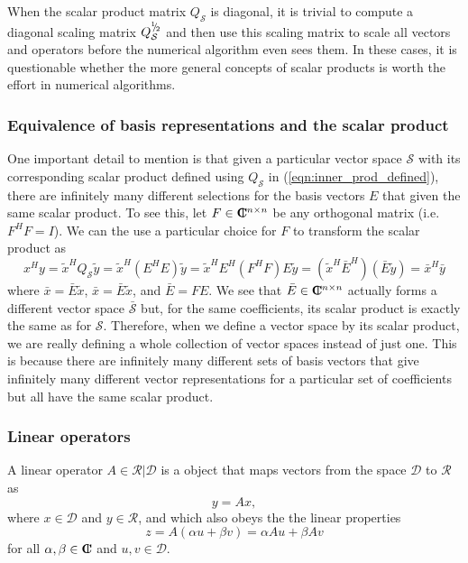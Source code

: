 When the scalar product matrix $Q_{\mathcal{S}}$ is diagonal, it is trivial to
compute a diagonal scaling matrix $Q_{\mathcal{S}}^{{}^1 \!\! / \! {}_2}$ and then use
this scaling matrix to scale all vectors and operators before the numerical
algorithm even sees them.  In these cases, it is questionable whether the more
general concepts of scalar products is worth the effort in numerical
algorithms.

\subsubsection{Equivalence of basis representations and the scalar product}

One important detail to mention is that given a particular vector space
$\mathcal{S}$ with its corresponding scalar product defined using
$Q_{\mathcal{S}}$ in (\ref{eqn:inner_prod_defined}), there are infinitely many
different selections for the basis vectors $E$ that given the same scalar
product.  To see this, let $F\in\mbox{\textbf{C}}\hspace{-1.1ex}\mbox{l}\hspace{0.4ex}^{n\times{}n}$ be any orthogonal matrix
(i.e.\ $F^H F = I$).  We can the use a particular choice for $F$ to transform
the scalar product as
%
\begin{equation}
x^H y = \tilde{x}^H Q_{\mathcal{S}} \tilde{y}
= \tilde{x}^H ( E^H E ) \tilde{y}
= \tilde{x}^H E^H ( F^H F ) E \tilde{y}
= ( \tilde{x}^H \bar{E}^H ) ( \bar{E} \tilde{y} )
= \bar{x}^H \bar{y}
\label{eqn:inner_x_y_F_E_prod}
\end{equation}
%
where $\bar{x} = {}\bar{E} {}\tilde{x}$, $\bar{x} = {}\bar{E} {}\tilde{x}$,
and $\bar{E} = F E$.  We see that $\bar{E}\in\mbox{\textbf{C}}\hspace{-1.1ex}\mbox{l}\hspace{0.4ex}^{n\times{}n}$ actually forms
a different vector space $\bar{\mathcal{S}}$ but, for the same coefficients,
its scalar product is exactly the same as for $\mathcal{S}$.  Therefore, when
we define a vector space by its scalar product, we are really defining a whole
collection of vector spaces instead of just one.  This is because there are
infinitely many different sets of basis vectors that give infinitely many
different vector representations for a particular set of coefficients but all
have the same scalar product.

\subsubsection{Linear operators}

A linear operator $A\in\mathcal{R}|\mathcal{D}$ is a object that maps vectors
from the space $\mathcal{D}$ to $\mathcal{R}$ as
%
\begin{equation}
y = A x,
\label{eqn:fwd_op_apply}
\end{equation}
%
where $x\in\mathcal{D}$ and $y\in\mathcal{R}$, and which also obeys the the
linear properties
%
\begin{equation}
z = A(\alpha u + \beta v) = \alpha A u + \beta A v
\label{eqn:linear_op_properties}
\end{equation}
%
for all $\alpha,\beta\in\mbox{\textbf{C}}\hspace{-1.1ex}\mbox{l}\hspace{0.4ex}$ and $u,v\in\mathcal{D}$.

